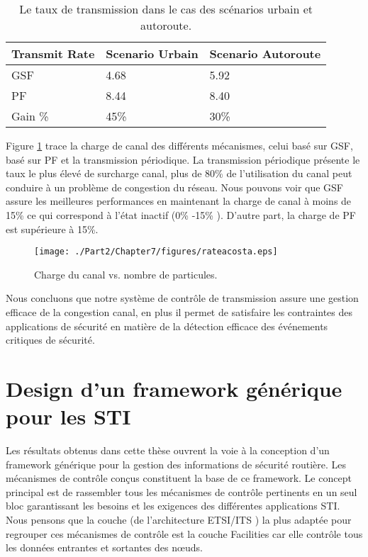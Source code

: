 \begin{table}
	\centering
	\begin{tabular}{lll}
		\toprule
Transmit Rate & Scenario Urbain & Scenario Autoroute\\
\midrule 
GSF           & 4.68           &  5.92  \\
\midrule 
PF            & 8.44           & 8.40 \\
\midrule 
Gain \%    &  45\%          & 30\%  \\
		\bottomrule
	\end{tabular}
	\caption{\label{tab:rate}Le taux de transmission dans le cas des scénarios urbain et autoroute.}
\end{table}

Figure \ref{rate} trace la charge de canal des différents mécanismes, celui basé sur GSF, basé sur PF et la transmission périodique. La transmission périodique présente le taux le plus élevé de surcharge canal, plus de 80\% de l'utilisation du canal peut conduire à un problème de congestion du réseau. Nous pouvons voir que GSF assure les meilleures performances en maintenant la charge de canal à moins de 15\% ce qui correspond à l'état inactif (0\% -15\% ). D'autre part, la charge de PF est supérieure à 15\%.

\begin{figure}[!h]
\centering
\texttt{[image: ./Part2/Chapter7/figures/rateacosta.eps]}
\caption{Charge du canal vs. nombre de particules.}
\label{rate}
\end{figure}

Nous concluons que notre système de contrôle de transmission assure une gestion efficace de la congestion canal, en plus il permet de satisfaire les contraintes des applications de sécurité en matière de la détection efficace des événements critiques de sécurité.

\section{Design d'un framework générique pour les STI\label{frame}}

Les résultats obtenus dans cette thèse ouvrent la voie à la conception d'un framework générique pour la gestion des informations de sécurité routière. Les mécanismes de contrôle con\c{c}us constituent la base de ce framework. Le concept principal est de rassembler tous les mécanismes de contrôle pertinents en un seul bloc garantissant les besoins et les exigences des différentes applications STI. Nous pensons que la couche (de l'architecture ETSI/ITS \cite{etsi}) la plus adaptée pour regrouper ces mécanismes de contrôle est la couche Facilities car elle contrôle tous les données entrantes et sortantes des nœuds.

